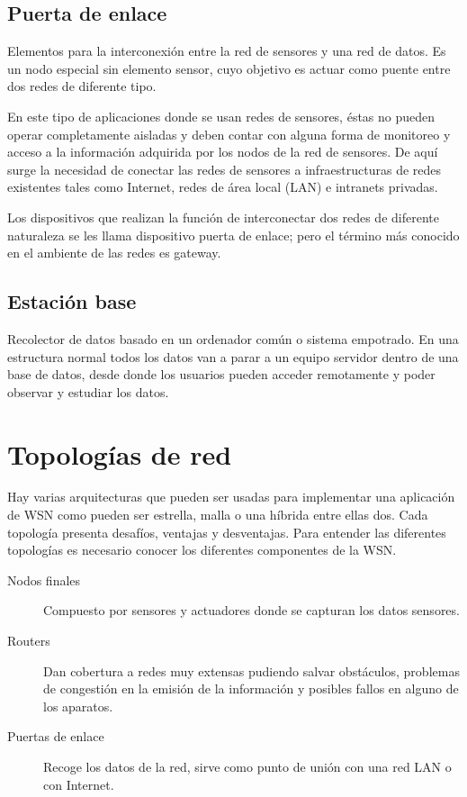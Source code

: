 \subsection{Puerta de enlace}
Elementos para la interconexi\'on entre la red de sensores y una red de datos. Es un nodo especial sin elemento sensor, cuyo objetivo es actuar como puente entre dos redes de diferente tipo. 

En este tipo de aplicaciones donde se usan redes de sensores, \'estas no pueden operar completamente aisladas y deben contar con alguna forma de monitoreo y acceso a la informaci\'on adquirida por los nodos de la red de sensores. De aqu\'i surge la necesidad de conectar las redes de sensores a infraestructuras de redes existentes tales como Internet, redes de \'area local (LAN) e intranets privadas. 

Los dispositivos que realizan la funci\'on de interconectar dos redes de diferente naturaleza se les llama dispositivo puerta de enlace; pero el t\'ermino m\'as conocido en el ambiente de las redes es gateway. 

\subsection{Estaci\'on base}
Recolector de datos basado en un ordenador com\'un o sistema empotrado. En una estructura normal todos los datos van a parar a un equipo servidor dentro de una base de datos, desde donde los usuarios pueden acceder remotamente y poder observar y estudiar los datos.

\section{Topolog\'ias de red} 

Hay varias arquitecturas que pueden ser usadas para implementar una aplicaci\'on de WSN como pueden ser estrella, malla o una h\'ibrida entre ellas dos. Cada topolog\'ia presenta desaf\'ios, ventajas y desventajas. Para entender las diferentes topolog\'ias es necesario conocer los diferentes componentes de la WSN. 

\begin{description}
\item [Nodos finales] Compuesto por sensores y actuadores donde se capturan los datos sensores. 

\item [Routers] Dan cobertura a redes muy extensas pudiendo salvar obst\'aculos, problemas de congesti\'on en la emisi\'on de la informaci\'on y posibles fallos en alguno de los aparatos. 

\item [Puertas de enlace] Recoge los datos de la red, sirve como punto de uni\'on con una red LAN o con Internet. 
\end{description}


